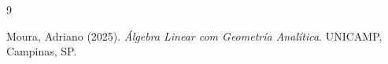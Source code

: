 \documentclass[a4paper, 17pt]{extarticle}
\begin{document}
\renewcommand{\thesection}{\arabic{section}.}
\renewcommand{\thesubsection}{\thesection\arabic{subsection}.}
\setcounter{section}{7}

{\small 
 
 
 
 
 
 
 
 
 
 






\begin{thebibliography}{9}


Moura, Adriano (2025). \textit{Álgebra Linear com Geometría Analítica}. UNICAMP, Campinas, SP. 

\end{thebibliography}
}

\end{document}
